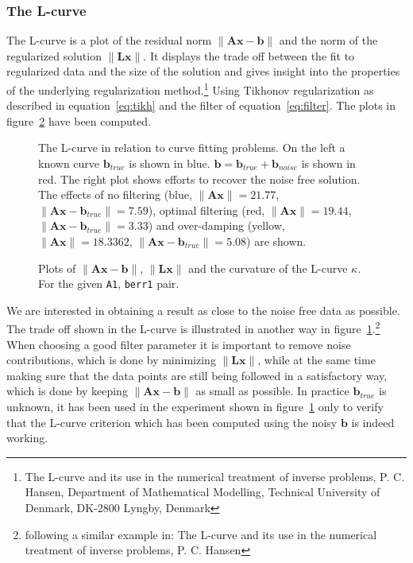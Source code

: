 \subsubsection{The L-curve}
The L-curve is a plot of the residual norm $\|\mathbf{Ax} - \mathbf{b}\|$ and the norm of the regularized solution $\|\mathbf{Lx}\|$. It displays the trade off between the fit to regularized data and the size of the solution and gives insight into the properties of the underlying regularization method.\footnote{The L-curve and its use in the numerical treatment of inverse problems, P. C. Hansen, Department of Mathematical Modelling, Technical University of Denmark, DK-2800 Lyngby, Denmark} Using Tikhonov regularization as described in equation~\ref{eq:tikh} and the filter of equation~\ref{eq:filter}. The plots in figure~\ref{fig:A1LTihk} have been computed. 
\begin{figure}
\centering

\caption{The L-curve in relation to curve fitting problems. On the left a known curve $\mathbf{b}_{true}$ is shown in blue. $\mathbf{b} = \mathbf{b}_{true} + \mathbf{b}_{noise}$ is shown in red. The right plot shows efforts to recover the noise free solution. The effects of no filtering (blue, $\|\mathbf{Ax}\| = 21.77$, $\|\mathbf{Ax}-\mathbf{b}_{true}\| =7.59$), optimal filtering (red, $\|\mathbf{Ax}\| = 19.44$, $\|\mathbf{Ax}-\mathbf{b}_{true}\| = 3.33$) and over-damping (yellow, $\|\mathbf{Ax}\| =  18.3362$, $\|\mathbf{Ax}-\mathbf{b}_{true}\| = 5.08$) are shown.} 
\label{fig:knownFitFilt}
\end{figure} 
\begin{figure}
\centering



\caption{Plots of $\|\mathbf{Ax} - \mathbf{b}\|$, $\|\mathbf{Lx}\|$ and the curvature of the L-curve $\kappa$. For the given \texttt{A1}, \texttt{berr1} pair.} 
\label{fig:A1LTihk}
\end{figure} 
We are interested in obtaining a result as close to the noise free data as possible. The trade off shown in the L-curve is illustrated in another way in figure~\ref{fig:knownFitFilt}.\footnote{following a similar example in: The L-curve and its use in the numerical treatment of inverse problems, P. C. Hansen} When choosing a good filter parameter it is important to remove noise contributions, which is done by minimizing $\|\mathbf{Lx}\|$, while at the same time making sure that the data points are still being followed in a satisfactory way, which is done by keeping $\|\mathbf{Ax} - \mathbf{b}\|$ as small as possible. In practice $\mathbf{b}_{true}$ is unknown, it has been used in the experiment shown in figure~\ref{fig:knownFitFilt} only to verify that the L-curve criterion which has been computed using the noisy $\mathbf{b}$ is indeed working. 

